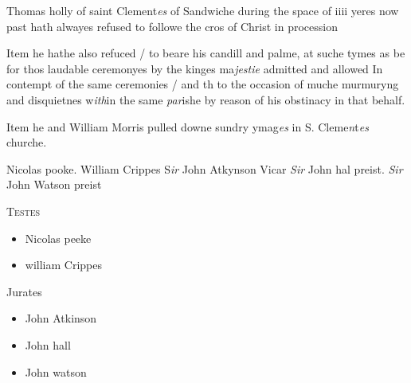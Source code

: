 \documentclass[12pt, a4paper]{book}
\begin{document}
		               		
		\ifthenelse{\isodd{\thepage}}
		{\reversemarginpar}
		{\normalmarginpar}
		Thomas holly of saint Clement\textit{es} of Sandwiche
		  during the space of iiii yeres now past hath
		 alwayes refused to followe the cros of Christ in
		 procession
		               	
		
			
				\marginpar[\vspace{0.5cm}{\textcolor{Gray}{ceremonies}}]{}
			
			
		\ifthenelse{\isodd{\thepage}}
		{\reversemarginpar}
		{\normalmarginpar}
		Item he hathe also refuced / to beare his candill
		 and palme, at suche tymes as be for thos laudable
		 ceremonyes by the kinges ma\textit{jestie} admitted and allowed
		 In contempt of the same ceremonies / and th to the
		 occasion of muche murmuryng and disquietnes w\textit{ith}in
		 the same \textit{par}ishe by reason of his obstinacy in that
		 behalf.
		
		
			
			
		\ifthenelse{\isodd{\thepage}}
		{\reversemarginpar}
		{\normalmarginpar}
		Item he and William Morris pulled downe
		 sundry ymag\textit{es} in S. Cleme\textit{n}t\textit{es} churche.
		               	
		\ifthenelse{\isodd{\thepage}}
		{\reversemarginpar}
		{\normalmarginpar}
		Nicolas pooke. William Crippes S\textit{ir} John Atkynson Vicar \textit{Sir} John hal preist.
		               		\textit{Sir} John Watson preist
			
		
			\begin{center} {\scshape Testes} \end{center}\begin{itemize}
				
				\item[]Nicolas peeke
				\item[]william Crippes
			\end{itemize}
			
		\ifthenelse{\isodd{\thepage}}
		{\reversemarginpar}
		{\normalmarginpar}
		 Jurates
			\begin{itemize}
				\item[]John Atkinson
				\item[]John hall
				\item[]John watson
			\end{itemize}
			
\end{document}
